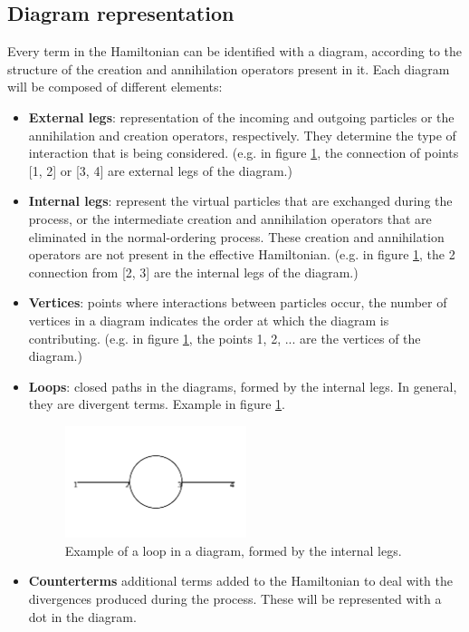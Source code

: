 \documentclass[11pt,a4paper,twoside,pdf]{article}
\numberwithin{equation}{section}
\begin{document}
\subsection{Diagram representation}

Every term in the Hamiltonian can be identified with a diagram, according to the 
structure of the creation and annihilation operators present in it. Each diagram 
will be composed of different elements:

\begin{itemize}
    \item \textbf{External legs}: representation of the incoming and outgoing particles or 
    the annihilation and creation operators, respectively. They determine the type 
    of interaction that is being considered. (e.g. in figure \ref{fig:loop_example},
    the connection of points [1, 2] or [3, 4] are external legs of the diagram.)
    \item \textbf{Internal legs}: represent the virtual particles that are exchanged during the
    process, or the intermediate creation and annihilation operators that are 
    eliminated in the normal-ordering process. These creation and annihilation operators
    are not present in the effective Hamiltonian. (e.g. in figure \ref{fig:loop_example},
    the 2 connection from [2, 3] are the internal legs of the diagram.)
    \item \textbf{Vertices}: points where interactions between particles occur, the number of
    vertices in a diagram indicates the order at which the diagram is contributing. 
    (e.g. in figure \ref{fig:loop_example}, the points 1, 2, ... are the vertices
    of the diagram.)
    \item \textbf{Loops}: closed paths in the diagrams, formed by the internal legs. In 
    general, they are divergent terms. Example in figure \ref{fig:loop_example}.
    \begin{figure}[h!]
        \centering
        \includegraphics[width=0.5\textwidth]{plots/order2/from_order1/3.png}
        \caption{Example of a loop in a diagram, formed by the internal legs.}
        \label{fig:loop_example}
    \end{figure}
    \item \textbf{Counterterms} additional terms added to the Hamiltonian to deal with the divergences
    produced during the process. These will be represented with a dot in the diagram.
\end{itemize}
\end{document}
